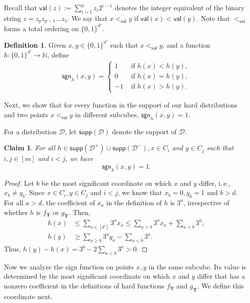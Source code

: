 \documentclass[11pt]{article}
\numberwithin{equation}{section}
\newtheorem{claim}[theorem]{Claim}
\theoremstyle{definition}
\newtheorem{definition}[theorem]{Definition}
\theoremstyle{plain}
\newcommand{\N}{\mathbb N}
\newcommand{\ie}{i.\,e.}
\newcommand{\bT}{\ensuremath{\mathbf{T}}}
\newcommand{\cD}{\ensuremath{\mathcal{D}}}
\newcommand{\Yes}{\ensuremath{\mathcal{D}^+}}
\newcommand{\No}{\ensuremath{\mathcal{D}^-}}
\newcommand{\order}{\ensuremath{<_\dec}}
\newcommand{\dd}{\ensuremath{{d'}}}
\newcommand{\dec}{\mathsf{val}}
\newcommand{\sgn}{\mathsf{sgn}}
\newcommand{\supp}{\mathsf{supp}}
\begin{document}
Recall that $\dec(z) := \sum_{i = 1}^p z_i 2^{i-1}$ denotes the integer equivalent of the binary string $z = z_p z_{p-1} \ldots z_1$.
We say that $x \order y$ if $\dec(x) < \dec(y)$. Note that $\order$ forms a total ordering
on $\{0,1\}^{\dd}$.

\begin{definition}
Given $x,y\in \{0,1\}^\dd$ such that $x \order y$, and a function $h:\{0,1\}^\dd\to \N$, define
\begin{align*}
\sgn_h(x,y) =
\begin{cases}
1 &\text{ if } h(x) < h(y), \\
0 &\text{ if } h(x) = h(y), \\
-1 &\text{ if } h(x) > h(y).
\end{cases}
\end{align*}
\end{definition}

%

Next, we show that for every function in the support of our hard distributions and two points $x \order y$ in different subcubes, $\sgn_h(x,y) = 1$.

For a distribution $\cD$, let $\supp(\cD)$ denote the support of $\cD$.

\begin{claim}\label{clm:inv}
For all $h \in \supp(\Yes) \cup \supp(\No), x \in C_i$ and $y \in C_j$ such that $i,j \in [m]$ and $i < j$, we have \[\sgn_h(x,y) = 1.\]
\end{claim}

\begin{proof}
Let $b$ be the most significant coordinate on which $x$ and $y$ differ, \ie, $x_b \neq y_b$. Since $x \in C_i, y \in C_j$ and $i < j$, we know that $x_b = 0, y_b = 1$ and $b > d$. For all $a > d$, the coefficient of $x_a$ in the definition of $h$ is $3^a$, irrespective of whether $h$ is $f_\bT$ or $g_\bT$.
Then,
\begin{align*}
h(x) &\leq \sum\limits_{a \in [\dd]} 3^a x_a \leq \sum\limits_{a > b} 3^a x_a + \sum\limits_{a < b} 3^a ;\\
h(y) &\geq \sum\limits_{a \geq b} 3^a y_a - \sum\limits_{a < b} 3^a.
\end{align*}
Thus, $h(y) - h(x) = 3^b - 2 \sum_{a < b} 3^a > 0$.
%
%
%
%
%
\end{proof}

%

Now we analyze the sign function on points $x,y$ in the same subcube. Its value is determined by the most significant coordinate on which $x$ and $y$ differ that has a nonzero coefficient in the definitions of hard functions $f_\bT$ and $g_\bT$. We define this coordinate next.
\end{document}
